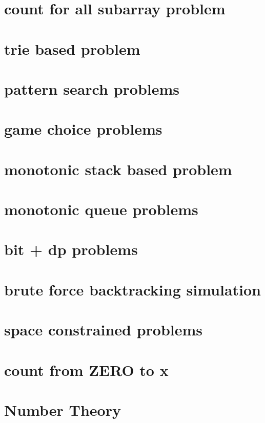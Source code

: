 \chapter{count for all subarray problem}
\chapter{trie based problem}
\chapter{pattern search problems}
\chapter{game choice problems}

\chapter{monotonic stack based problem}
\chapter{monotonic queue problems}
\chapter{bit + dp problems}
\chapter{brute force backtracking simulation}
\chapter{space constrained problems}
\chapter{count from ZERO to x}

\chapter{Number Theory}


